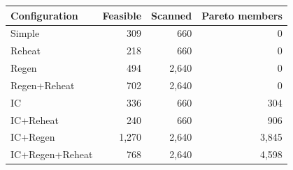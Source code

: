 \begin{tabular}{lrrr}\toprule Configuration & Feasible & Scanned & Pareto members\\\midrule
Simple & 309 & 660 & 0\\
Reheat & 218 & 660 & 0\\
Regen & 494 & 2,640 & 0\\
Regen+Reheat & 702 & 2,640 & 0\\
IC & 336 & 660 & 304\\
IC+Reheat & 240 & 660 & 906\\
IC+Regen & 1,270 & 2,640 & 3,845\\
IC+Regen+Reheat & 768 & 2,640 & 4,598\\
\bottomrule\end{tabular}